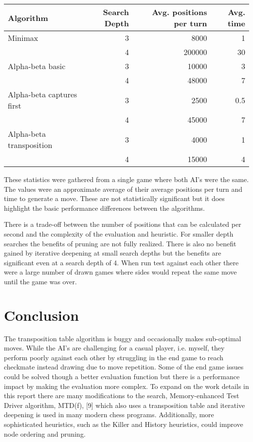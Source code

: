 \documentclass[11pt]{article}
\begin{document}
\begin{center}
\begin{tabular}{lrrr}
Algorithm & Search Depth & Avg. positions per turn & Avg. time\\
\hline
Minimax & 3 & 8000 & 1\\
 & 4 & 200000 & 30\\
Alpha-beta basic & 3 & 10000 & 3\\
 & 4 & 48000 & 7\\
Alpha-beta captures first & 3 & 2500 & 0.5\\
 & 4 & 45000 & 7\\
Alpha-beta transposition & 3 & 4000 & 1\\
 & 4 & 15000 & 4\\
\end{tabular}
\end{center}
These statistics were gathered from a single game where both AI's were the same. The values were an approximate average of their average positions per turn and time to generate a move. These are not statistically significant but it does highlight the basic performance differences between the algorithms.

\vspace{2.5mm}
There is a trade-off between the number of positions that can be calculated per second and the complexity of the evaluation and heuristic. For smaller depth searches the benefits of pruning are not fully realized. There is also no benefit gained by iterative deepening at small search depths but the benefits are significant even at a search depth of 4. When run test against each other there were a large number of drawn games where sides would repeat the same move until the game was over.

\section*{Conclusion}
\label{sec:org125cbc3}
The transposition table algorithm is buggy and occasionally makes sub-optimal moves. While the AI's are challenging for a casual player, i.e. myself, they perform poorly against each other by struggling in the end game to reach checkmate instead drawing due to move repetition. Some of the end game issues could be solved though a better evaluation function but there is a performance impact by making the evaluation more complex. To expand on the work details in this report there are many modifications to the search, Memory-enhanced Test Driver algorithm, MTD(f), [9] which also uses a transposition table and iterative deepening is used in many modern chess programs. Additionally, more sophisticated heuristics, such as the Killer and History heuristics, could improve node ordering and pruning. 
\end{document}
